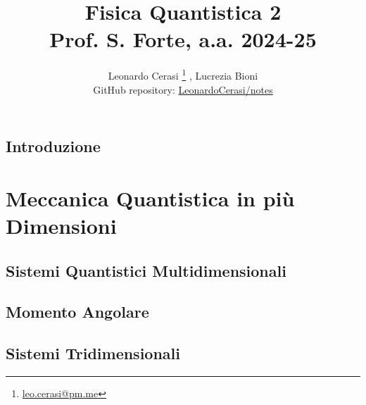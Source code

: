 \documentclass[a4paper, 12pt, openany]{book}
\author{Leonardo Cerasi%
	\thanks{\scriptsize\href{mailto:leonardo.cerasi@studenti.unimi.it}{leo.cerasi@pm.me}}%
	, Lucrezia Bioni\\
	\small GitHub repository: \href{https://github.com/LeonardoCerasi/notes}{LeonardoCerasi/notes}}
\title{\Huge\textbf{Fisica Quantistica 2} \\ \large Prof. S. Forte, a.a. 2024-25}
\begin{document}
\frontmatter

\maketitle

\tableofcontents
\pagestyle{indice}

\mainmatter

\chapter*{Introduzione}
\pagestyle{introd}


\part{Meccanica Quantistica in più Dimensioni}
\pagestyle{body}

\chapter{Sistemi Quantistici Multidimensionali}


\chapter{Momento Angolare}


\chapter{Sistemi Tridimensionali}

\end{document}
